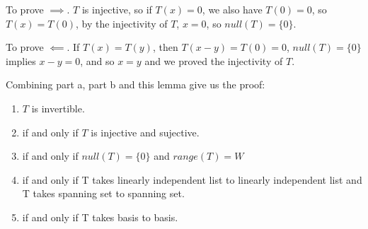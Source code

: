 To prove $ \implies $. $ T $ is injective, so if $ T(x) = 0 $, we also have $ T(0) = 0 $, so $ T(x) = T(0) $, by the injectivity of $ T $, $ x = 0 $, so $ null(T) = \{0\} $.

To prove $ \impliedby $. If $ T(x) = T(y) $, then $ T(x - y) = T(0) = 0 $, $ null(T) = \{0\} $ implies $ x - y = 0 $, and so $ x = y $ and we proved the injectivity of $ T $.

Combining part a, part b and this lemma give us the proof:

\begin{enumerate}
    \item $ T $ is invertible.
    \item if and only if $ T $ is injective and sujective.
    \item if and only if $ null(T) = \{0\} $ and $ range(T) = W $
    \item if and only if T takes linearly independent list to linearly independent list and T takes spanning set to spanning set.
    \item if and only if T takes basis to basis.
\end{enumerate}